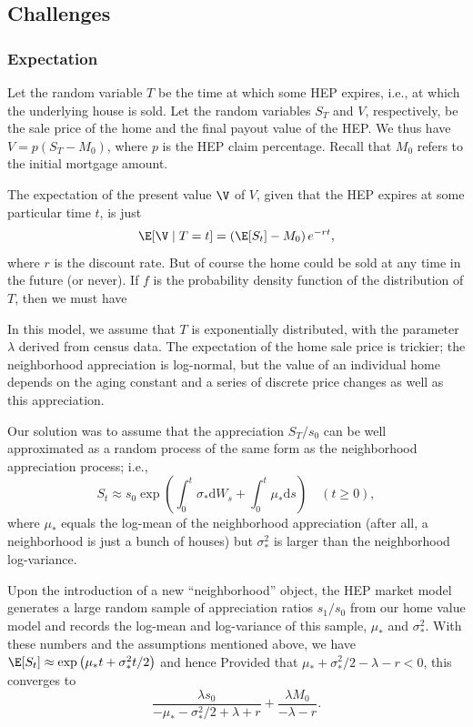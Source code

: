 \documentclass[twoside]{article}
\begin{document}
\subsection{Challenges}

\subsubsection{Expectation}\label{subsubsec:expectation}
Let the random variable $T$ be the time at which some HEP expires, i.e., at which the underlying house is sold. Let the random variables $S_T$ and $V$, respectively, be the sale price of the home and the final payout value of the HEP. We thus have $V=p(S_T-M_0)$, where $p$ is the HEP claim percentage. Recall that $M_0$ refers to the initial mortgage amount.


The expectation of the present value $\V$ of $V$, given that the HEP expires at some particular time $t$, is just 
$$
	\E[\V\mid T=t] = \left(\E[S_t]-M_0\right)e^{-rt},
$$
where $r$ is the discount rate. But of course the home could be sold at any time in the future (or never). If $f$ is the probability density function of the distribution of $T$, then we must have

In this model, we assume that $T$ is exponentially distributed, with the parameter $\lambda$ derived from census data. The expectation of the home sale price is trickier; the neighborhood appreciation is log-normal, but the value of an individual home depends on the aging constant and a series of discrete price changes as well as this appreciation.

Our solution was to assume that the appreciation $S_T/s_0$ can be well approximated as a random process of the same form as the neighborhood appreciation process; i.e.,
$$
S_t\approx s_0\exp\left({\int_{0}^{t}\sigma_*\mathrm{d}W_s + \int_0^t\mu_*\mathrm{d}s}\right)\quad(t\geq0),
$$
where $\mu_*$ equals the log-mean of the neighborhood appreciation (after all, a neighborhood is just a bunch of houses) but $\sigma_* ^2$ is larger than the neighborhood log-variance.

Upon the introduction of a new ``neighborhood'' object, the HEP market model generates a large random sample of appreciation ratios $s_1/s_0$ from our home value model and records the log-mean and log-variance of this sample, $\mu_*$ and $\sigma_*^2$. With these numbers and the assumptions mentioned above, we have $\E[S_t]\approx \exp\left({\mu_*t+\sigma_*^2t/2}\right)$ and hence
Provided that $\mu_*+\sigma_*^2/2-\lambda-r<0$, this converges to
$$
\frac{\lambda s_0}{-\mu_*-\sigma_*^2/2+\lambda+r}+\frac{\lambda M_0}{-\lambda-r}.
$$
\end{document}
